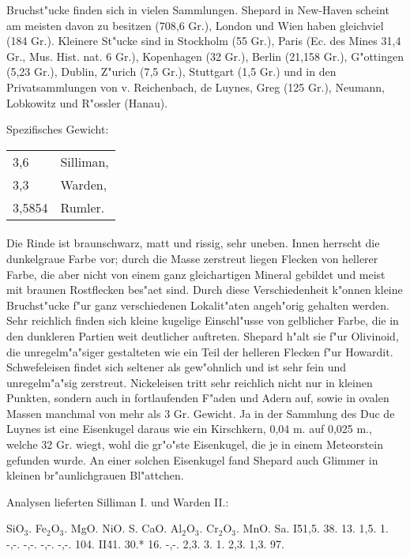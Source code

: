\documentclass[a4paper, 11pt, oneside]{article}
\begin{document}
Bruchst"ucke finden sich in vielen Sammlungen. Shepard in New-Haven scheint am meisten davon zu besitzen (708,6 Gr.), London und Wien haben gleichviel (184 Gr.). Kleinere St"ucke sind in Stockholm (55 Gr.), Paris (Ec. des Mines 31,4 Gr., Mus. Hist. nat. 6 Gr.), Kopenhagen (32 Gr.), Berlin (21,158 Gr.), G"ottingen (5,23 Gr.), Dublin, Z"urich (7,5 Gr.), Stuttgart (1,5 Gr.) und in den Privatsammlungen von v. Reichenbach, de Luynes, Greg (125 Gr.), Neumann, Lobkowitz und R"ossler (Hanau).

Spezifisches Gewicht:
\begin{table}[!ht]
    \centering
    \begin{tabular}{l l}
        3,6 & Silliman,\\
        3,3 & Warden,\\
        3,5854 & Rumler.
    \end{tabular}
\end{table}
\paragraph{}
Die Rinde ist braunschwarz, matt und rissig, sehr uneben. Innen herrscht die dunkelgraue Farbe vor; durch die Masse zerstreut liegen Flecken von hellerer Farbe, die aber nicht von einem ganz gleichartigen Mineral gebildet und meist mit braunen Rostflecken bes"aet sind. Durch diese Verschiedenheit k"onnen kleine Bruchst"ucke f"ur ganz verschiedenen Lokalit"aten angeh"orig gehalten werden. Sehr reichlich finden sich kleine kugelige Einschl"usse von gelblicher Farbe, die in den dunkleren Partien weit deutlicher auftreten. Shepard h"alt sie f"ur Olivinoid, die unregelm"a"siger gestalteten wie ein Teil der helleren Flecken f"ur Howardit. Schwefeleisen findet sich seltener als gew"ohnlich und ist sehr fein und unregelm"a"sig zerstreut. Nickeleisen tritt sehr reichlich nicht nur in kleinen Punkten, sondern auch in fortlaufenden F"aden und Adern auf, sowie in ovalen Massen manchmal von mehr als 3 Gr. Gewicht. Ja in der Sammlung des Duc de Luynes ist eine Eisenkugel daraus wie ein Kirschkern, 0,04 m. auf 0,025 m., welche 32 Gr. wiegt, wohl die gr"o"ste Eisenkugel, die je in einem Meteorstein gefunden wurde. An einer solchen Eisenkugel fand Shepard auch Glimmer in kleinen br"aunlichgrauen Bl"attchen.

Analysen lieferten Silliman I. und Warden II.:

SiO$_{3}$. Fe$_{2}$O$_{3}$. MgO. NiO. S. CaO. Al$_{2}$O$_{3}$. Cr$_{2}$O$_{3}$. MnO. Sa.  
I\. 51,5. 38. 13. 1,5. 1. -,-. -,-. -,-. -,-. 104.  
II\. 41. 30.* 16. -,-. 2,3. 3. 1. 2,3. 1,3. 97.  
\end{document}
